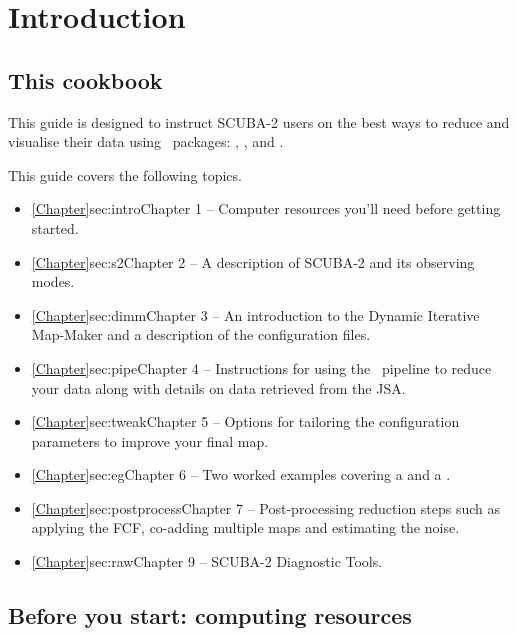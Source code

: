 \chapter{Introduction}
\label{sec:intro}

\renewcommand{\thepage}{\arabic{page}}
\setcounter{page}{1}

\section{This cookbook}

This guide is designed to instruct SCUBA-2 users on the best ways to
reduce and visualise their data using \starlink\ packages:
\smurf \cite{smurf}, \Kappa \cite{kappa}, \gaia \cite{gaia} and \picard
\cite{picard}.

This guide covers the following topics.
\begin{itemize}
\itemsep0em
\item \cref{Chapter}{sec:intro}{Chapter 1} -- Computer resources you'll need before getting started.
\item \cref{Chapter}{sec:s2}{Chapter 2} -- A description of SCUBA-2 and its observing modes.
\item \cref{Chapter}{sec:dimm}{Chapter 3}  -- An introduction to the Dynamic Iterative Map-Maker and a description of the configuration files.
\item \cref{Chapter}{sec:pipe}{Chapter 4}  -- Instructions for using the \oracdr\ pipeline to reduce your data along with details on data retrieved from the JSA.
\item \cref{Chapter}{sec:tweak}{Chapter 5}  -- Options for tailoring the configuration parameters to improve your final map.
\item \cref{Chapter}{sec:eg}{Chapter 6}  -- Two worked examples covering a  and a .
\item \cref{Chapter}{sec:postprocess}{Chapter 7}  -- Post-processing reduction steps such as applying the FCF, co-adding multiple maps and estimating the noise.
\item \cref{Chapter}{sec:raw}{Chapter 9}  -- SCUBA-2 Diagnostic Tools.


\end{itemize}


\section{ Before you start: computing resources}

